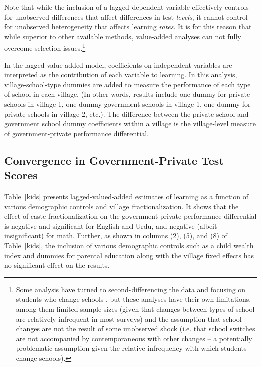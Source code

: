 \documentclass[Eubank_pk_ethnic_sorting.tex]{subfiles}
\begin{document}
Note that while the inclusion of a lagged dependent variable effectively controls for unobserved differences that affect differences in test \emph{levels}, it cannot control for unobserved heterogeneity that affects learning \emph{rates}. It is for this reason that while superior to other available methods, value-added analyses can not fully overcome selection issues.\footnote{Some analysis have turned to second-differencing the data and focusing on students who change schools \citep{Andrabi:2011hl}, but these analyses have their own limitations, among them limited sample sizes (given that changes between types of school are relatively infrequent in most surveys) and the assumption that school changes are not the result of some unobserved shock (i.e. that school switches are not accompanied by contemporaneous with other changes -- a potentially problematic assumption given the relative infrequency with which students change schools).}

In the lagged-value-added model, coefficients on independent variables are interpreted as the contribution of each variable to learning. In this analysis, village-school-type dummies are added to measure the performance of each type of school in each village. (In other words, results include one dummy for private schools in village 1, one dummy government schools in village 1, one dummy for private schools in village 2, etc.). The difference between the private school and government school dummy coefficients within a village is the village-level measure of government-private performance differential.

\subsection{Convergence in Government-Private Test Scores}\label{}


Table~\ref{kids} presents lagged-valued-added estimates of learning as a function of various demographic controls and village fractionalization. It shows that the effect of caste fractionalization on the government-private performance differential is negative and significant for English and Urdu, and negative (albeit insignificant) for math. Further, as shown in columns (2), (5), and (8) of Table~\ref{kids}, the inclusion of various demographic controls such as a child wealth index and dummies for parental education along with the village fixed effects has no significant effect on the results.


\end{document}
